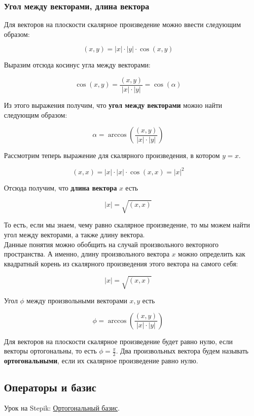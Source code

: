 \documentclass{article}
\begin{document}
\subsubsection{Угол между векторами, длина вектора}

Для векторов на плоскости скалярное произведение можно ввести следующим образом:

$$(x, y) = |x| \cdot |y| \cdot \cos(x, y)$$

Выразим отсюда косинус угла между векторами:

$$ \cos(x, y) = \frac{(x, y)}{|x| \cdot |y|} = \cos (\alpha) $$

Из этого выражения получим, что \textbf{угол между векторами} можно найти следующим образом:

$$ \alpha = \arccos\left(\frac{(x, y)}{|x| \cdot |y|}\right) $$

Рассмотрим теперь выражение для скалярного произведения, в котором $y = x$.

$$ (x, x) = |x| \cdot |x| \cdot \cos(x, x) = {|x|}^2 $$

Отсюда получим, что \textbf{длина вектора} $x$ есть

$$ |x| = \sqrt{(x, x)} $$

То есть, если мы знаем, чему равно скалярное произведение, то мы можем найти угол между векторами, а также длину вектора. \\

Данные понятия можно обобщить на случай произвольного векторного пространства. А именно, длину произвольного вектора $x$ можно определить как квадратный корень из скалярного произведения этого вектора на самого себя:

$$ |x| = \sqrt{(x, x)} $$

Угол $\phi$ между произвольными векторами $x, y$ есть

$$ \phi = \arccos\left(\frac{(x, y)}{|x| \cdot |y|}\right) $$

Для векторов на плоскости скалярное произведение будет равно нулю, если векторы ортогональны, то есть $\phi = \frac{\pi}{2}$. Два произвольных вектора будем называть \textbf{ортогональными}, если их скалярное произведение равно нулю.

\subsection{Операторы и базис}

Урок на Stepik: \href{https://stepik.org/lesson/9584/step/1?unit=23534}{Ортогональный базис}.
\end{document}
